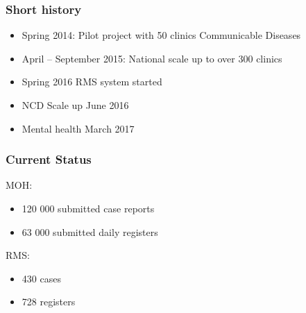 \documentclass{beamer}
\begin{document}
\begin{frame}
  \frametitle{Short history}
  \begin{itemize}
  \item Spring 2014: Pilot project with 50 clinics Communicable Diseases
  \item April -- September 2015: National scale up to over 300 clinics
  \item Spring 2016 RMS system started
  \item NCD Scale up June 2016
  \item Mental health March 2017
  \end{itemize}
\end{frame}

\begin{frame}
  \frametitle{Current Status}

  MOH: 
  \begin{itemize}
  \item 120 000 submitted case reports
  \item 63 000 submitted daily registers
  \end{itemize}
  RMS:
  \begin{itemize}
  \item 430 cases
  \item 728 registers
  \end{itemize}
\end{frame}
\end{document}
